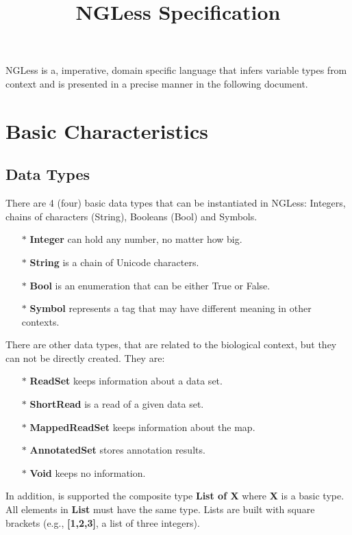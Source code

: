 \documentclass{article}
\title{NGLess Specification}
\begin{document}
\maketitle

NGLess is a, imperative, domain specific language that infers variable types from context and is presented in a precise manner in the following document.

\section{Basic Characteristics}

\subsection{Data Types}
\label{sec:datatypes}

There are 4 (four) basic data types that can be instantiated in NGLess: Integers, chains of characters (String), Booleans (Bool) and Symbols.

\begin{itemize}
\item[$\ast$] \textbf{Integer} can hold any number, no matter how big.
\item[$\ast$] \textbf{String} is a chain of Unicode characters.
\item[$\ast$] \textbf{Bool} is an enumeration that can be either True or False.
\item[$\ast$] \textbf{Symbol} represents a tag that may have different meaning in other contexts.
\end{itemize}

\noindent
There are other data types, that are related to the biological context, but they can not be directly created. They are:

\begin{itemize}
\item[$\ast$] \textbf{ReadSet} keeps information about a data set.
\item[$\ast$] \textbf{ShortRead} is a read of a given data set.
\item[$\ast$] \textbf{MappedReadSet} keeps information about the map.
\item[$\ast$] \textbf{AnnotatedSet} stores annotation results.
\item[$\ast$] \textbf{Void} keeps no information.
\end{itemize}

In addition, is supported the composite type \textbf{List of X} where \textbf{X} is a basic type. All elements in \textbf{List} must have the same type. Lists are built with square brackets (e.g., \textbf{[1,2,3]}, a list of three integers).
\end{document}
